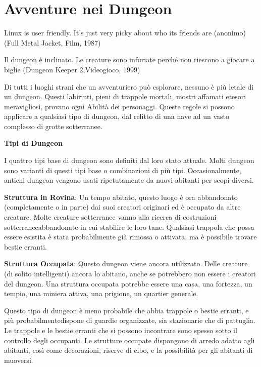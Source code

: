 \documentclass[a4paper,11pt,twoside,openany]{book}
\begin{document}
\pagebreak

\section{Avventure nei Dungeon}

\begin{tcolorbox}[enhanced,arc=5pt,boxrule=0.3pt]{
Linux is user friendly. It's just very picky about who its friends are (anonimo) (Full Metal Jacket, Film, 1987)}\end{tcolorbox}
\medskip


\label{avventure-nei-dungeon}
\begin{tcolorbox}[enhanced,arc=5pt,boxrule=0.3pt]{Il dungeon è inclinato. Le creature sono infuriate perché non riescono a giocare a biglie (Dungeon Keeper 2,Videogioco, 1999)}\end{tcolorbox}\medskip

Di tutti i luoghi strani che un avventuriero può esplorare, nessuno è più letale di un dungeon. Questi labirinti, pieni di trappole mortali, mostri affamati etesori meravigliosi, provano ogni Abilità dei personaggi. Queste regole si possono applicare a qualsiasi tipo di dungeon, dal relitto di una nave ad un vasto complesso di grotte sotterranee.

\textbf{Tipi di Dungeon}

I quattro tipi base di dungeon sono definiti dal loro stato attuale. Molti dungeon sono varianti di questi tipi base o combinazioni di più tipi. Occasionalmente, antichi dungeon vengono usati ripetutamente da nuovi abitanti per scopi diversi.

\textbf{Struttura in Rovina}: Un tempo abitato, questo luogo è ora abbandonato (completamente o in parte) dai suoi creatori originari ed è occupato da altre creature. Molte creature sotterranee vanno alla ricerca di costruzioni sotterraneeabbandonate in cui stabilire le loro tane. Qualsiasi trappola che possa essere esistita è stata probabilmente già rimossa o attivata, ma è possibile trovare bestie erranti.

\textbf{Struttura Occupata}: Questo dungeon viene ancora utilizzato. Delle creature (di solito intelligenti) ancora lo abitano, anche se potrebbero non essere i creatori del dungeon. Una struttura occupata potrebbe essere una casa, una fortezza, un tempio, una miniera attiva, una prigione, un quartier generale.

Questo tipo di dungeon è meno probabile che abbia trappole o bestie erranti, e più probabilmentedispone di guardie organizzate, sia stazionarie che di pattuglia. Le trappole e le bestie erranti che si possono incontrare sono spesso sotto il controllo degli occupanti. Le strutture occupate dispongono di arredo adatto agli abitanti, così come decorazioni, riserve di cibo, e la possibilità per gli abitanti di muoversi.
\end{document}
